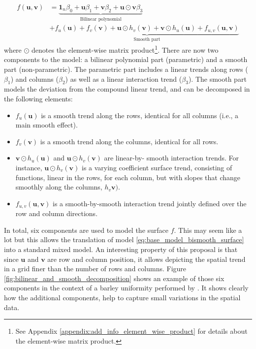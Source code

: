 	\begin{align}
	f ( \boldsymbol { u } , \boldsymbol { v } ) & = \underbrace { \mathbf { 1 } _ { n } \beta _ { 0 } + \boldsymbol { u } \beta
	 _ { 1 } + \boldsymbol { v } \beta _ { 2 } + \boldsymbol { u } \odot \boldsymbol { v } \beta _ { 3 } } _ { \text { Bilinear
	  polynomial } } \nonumber \\
	 & + \underbrace { f _ { u } ( \boldsymbol { u } ) + f _ { v } ( \boldsymbol { v } ) + \boldsymbol { u } \odot h _ { v } (
	  \boldsymbol { v } ) + \boldsymbol { v } \odot h _ { u } ( \boldsymbol { u } ) + f _ { u , v } ( \boldsymbol { u } ,
	   \boldsymbol { v } ) }_{\text{Smooth part}}
	 \label{eq:full_bivariate_smooth_surface_model}
	\end{align}
where $\odot$ denotes the element-wise matrix product\footnote{See Appendix \ref{appendix:add_info_element_wise_product} for details about the element-wise matrix product.}. There are now two components to the model: a bilinear polynomial part (parametric) and a smooth part (non-parametric). The parametric part includes a linear trends along rows ($\beta_1$) and columns ($\beta_2$) as well as a linear interaction trend ($\beta_3$). The smooth part models the deviation from the compound linear trend, and can be decomposed in the following elements:
	\begin{itemize}
		\item $f_{u}(\boldsymbol{u})$  is a smooth trend along the rows, identical for all columns (i.e., a main smooth effect).
		\item $f_{v}(\boldsymbol{v})$ is a smooth trend along the columns, identical for all rows.
		\item $\boldsymbol{v} \odot h_{u} (\boldsymbol{u})$ and $\boldsymbol{u} \odot h_{v} (\boldsymbol{v})$ are linear-by-
		smooth interaction trends. For instance, $\boldsymbol{u} \odot h_{v}(\boldsymbol{v})$ is a varying coefficient surface 
		trend, consisting of functions, linear in the rows, for each column, but with slopes that change smoothly along the 
		columns, $h_{v}\boldsymbol{v})$.
		\item $f_{u,v}(\boldsymbol{u},\boldsymbol{v})$ is a smooth-by-smooth interaction trend jointly defined over the row and 
		column directions.
	\end{itemize}
In total, six components are used to model the surface $f$. This may seem like a lot but this allows the translation of model \ref{eq:base_model_bismooth_surface} into a standard mixed model. An interesting property of this proposal is that since $\boldsymbol{u}$ and $\boldsymbol{v}$ are row and column position, it allows depicting the spatial trend in a grid finer than the number of rows and columns. Figure \ref{fig:bilinear_and_smooth_decomposition} shows an example of those six components in the context of a barley uniformity performed by \textcite{williams1988contemporary}. It shows clearly how the additional components, help to capture small variations in the spatial data.

